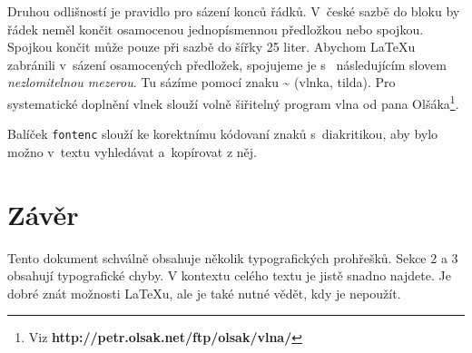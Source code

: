 \documentclass[a4paper, 10pt, twocolumn] {article}
\begin{document}
Druhou odlišností je pravidlo pro sázení konců řádků.
V~české sazbě do bloku by řádek neměl končit osamocenou jednopísmennou předložkou nebo spojkou.
Spojkou  končit může pouze při sazbě do šířky 25 liter.
Abychom \LaTeX u zabránili v~sázení osamocených předložek, spojujeme je s~ následujícím slovem \textit{nezlomitelnou mezerou}.
Tu sázíme pomocí znaku \~{} (vlnka, tilda).
Pro systematické doplnění vlnek slouží volně šiřitelný program vlna od pana Olšáka\footnote{Viz \textbf{http://petr.olsak.net/ftp/olsak/vlna/}}.

Balíček \texttt{fontenc} slouží ke korektnímu kódovaní znaků s~diakritikou, aby bylo možno v~textu vyhledávat a~kopírovat z něj. 

\section{Závěr}

Tento dokument schválně obsahuje několik typografických prohřešků.
Sekce 2 a 3 obsahují typografické chyby.
V kontextu celého textu je jistě snadno najdete.
Je dobré znát možnosti \LaTeX u, ale je také nutné vědět, kdy je nepoužít.
\end{document}
